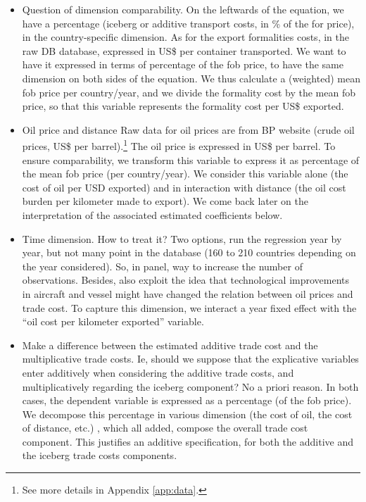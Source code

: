 \documentclass[a4paper,11pt]{article}
\begin{document}
\begin{itemize}
\item Question of dimension comparability. On the leftwards of the equation, we have a percentage (iceberg or additive transport costs, in \% of the for price), in the country-specific dimension. As for the export formalities costs, in the raw DB database, expressed in US\$ per container transported. We want to have it expressed in terms of percentage of the fob price, to have the same dimension on both sides of the equation. We thus calculate a (weighted) mean fob price per country/year, and we divide the formality cost by the mean fob price, so that this variable represents the formality cost per US\$ exported.

\item Oil price and distance Raw data for oil prices are from BP website (crude oil prices, US\$ per barrel).\footnote{See more details in Appendix \ref{app:data}.} The oil price is expressed in US\$ per barrel. To ensure comparability, we transform this variable to express it as percentage of the mean fob price (per country/year). We consider this variable alone (the cost of oil per USD exported) and in interaction with distance (the oil cost burden per kilometer made to export). We come back later on the interpretation of the associated estimated coefficients below.

\item Time dimension. How to treat it? Two options, run the regression year by year, but not many point in the database (160 to 210 countries depending on the year considered). So, in panel, way to increase the number of observations. Besides, also exploit the idea that technological improvements in aircraft and vessel might have changed the relation between oil prices and trade cost. To capture this dimension, we interact a year fixed effect with the ``oil cost per kilometer exported'' variable.

\item Make a difference between the estimated additive trade cost and the multiplicative trade costs. Ie, should we suppose that the explicative variables enter additively when considering the additive trade costs, and multiplicatively regarding the iceberg component? No a priori reason. In both cases, the dependent variable is expressed as a percentage (of the fob price). We decompose this percentage in various dimension (the cost of oil, the cost of distance, etc.) , which all added, compose the overall trade cost component. This justifies an additive specification, for both the additive and the iceberg trade costs components.


\end{itemize}
\end{document}
